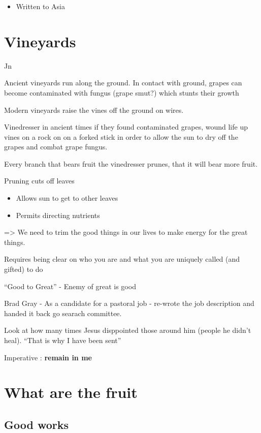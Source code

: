 \documentclass[
]{book}
\providecommand{\tightlist}{%
  \setlength{\itemsep}{0pt}\setlength{\parskip}{0pt}}
\begin{document}
\begin{itemize}
\tightlist
\item
  Written to Asia
\end{itemize}

\hypertarget{vineyards}{%
\section{Vineyards}\label{vineyards}}

Jn

Ancient vineyards run along the ground. In contact with ground, grapes can become contaminated with fungus (grape smut?) which stunts their growth

Modern vineyards raise the vines off the ground on wires.

Vinedresser in ancient times if they found contaminated grapes, wound life up vines on a rock on on a forked stick in order to allow the sun to dry off the grapes and combat grape fungus.

Every branch that bears fruit the vinedresser prunes, that it will bear more fruit.

Pruning cuts off leaves

\begin{itemize}
\tightlist
\item
  Allows sun to get to other leaves
\item
  Permits directing nutrients
\end{itemize}

=\textgreater{} We need to trim the good things in our lives to make energy for the great things.

Requires being clear on who you are and what you are uniquely called (and gifted) to do

``Good to Great'' - Enemy of great is good

Brad Gray - As a candidate for a pastoral job - re-wrote the job description and handed it back go searach committee.

Look at how many times Jesus disppointed those around him (people he didn't heal). ``That is why I have been sent''

Imperative : \textbf{remain in me}

\hypertarget{what-are-the-fruit}{%
\section{What are the fruit}\label{what-are-the-fruit}}

\hypertarget{good-works}{%
\subsection{Good works}\label{good-works}}
\end{document}
